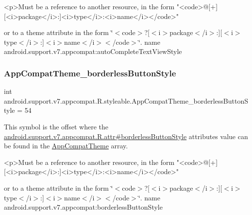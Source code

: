 \begin{DoxyVerb}      <p>Must be a reference to another resource, in the form "<code>@[+][<i>package</i>:]<i>type</i>:<i>name</i></code>"
\end{DoxyVerb}
 or to a theme attribute in the form \char`\"{}$<$code$>$?\mbox{[}$<$i$>$package$<$/i$>$\+:\mbox{]}\mbox{[}$<$i$>$type$<$/i$>$\+:\mbox{]}$<$i$>$name$<$/i$>$$<$/code$>$\char`\"{}.  name android.\+support.\+v7.\+appcompat\+:auto\+Complete\+Text\+View\+Style \mbox{\label{classandroid_1_1support_1_1v7_1_1appcompat_1_1R_1_1styleable_a0011ad8765746112dd3b16d0be2ae0dc}} 
\subsubsection{\texorpdfstring{App\+Compat\+Theme\+\_\+borderless\+Button\+Style}{AppCompatTheme\_borderlessButtonStyle}}
{\footnotesize\ttfamily int android.\+support.\+v7.\+appcompat.\+R.\+styleable.\+App\+Compat\+Theme\+\_\+borderless\+Button\+Style = 54\hspace{0.3cm}{\ttfamily [static]}}

This symbol is the offset where the \hyperlink{classandroid_1_1support_1_1v7_1_1appcompat_1_1R_1_1attr_a4a7129bedf5616c7e7d42c253187a694}{android.\+support.\+v7.\+appcompat.\+R.\+attr\#borderless\+Button\+Style} attribute\textquotesingle{}s value can be found in the \hyperlink{classandroid_1_1support_1_1v7_1_1appcompat_1_1R_1_1styleable_a5c42f89e8a410c323be34208d75c430b}{App\+Compat\+Theme} array.

\begin{DoxyVerb}      <p>Must be a reference to another resource, in the form "<code>@[+][<i>package</i>:]<i>type</i>:<i>name</i></code>"
\end{DoxyVerb}
 or to a theme attribute in the form \char`\"{}$<$code$>$?\mbox{[}$<$i$>$package$<$/i$>$\+:\mbox{]}\mbox{[}$<$i$>$type$<$/i$>$\+:\mbox{]}$<$i$>$name$<$/i$>$$<$/code$>$\char`\"{}.  name android.\+support.\+v7.\+appcompat\+:borderless\+Button\+Style \mbox{\label{classandroid_1_1support_1_1v7_1_1appcompat_1_1R_1_1styleable_a5a418303f6c9ee7dca64fc5e087c5d5d}} 
